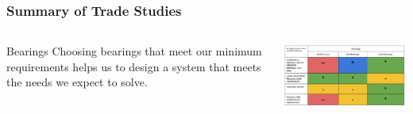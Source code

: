\documentclass[aspectratio=169]{beamer}
\begin{document}
\begin{frame}
    \frametitle{Summary of Trade Studies}

    \begin{columns}
        \begin{column}{0.28\textwidth}
            \begin{block}{Bearings}
                Choosing bearings that meet our minimum requirements
                helps us to design a system that meets the needs we
                expect to solve.
            \end{block}
        \end{column}

        \begin{column}{0.70\textwidth}
            \includegraphics[width=10.5cm]{BearingsTradeStudy}
        \end{column}
    \end{columns}

\end{frame}
\end{document}
